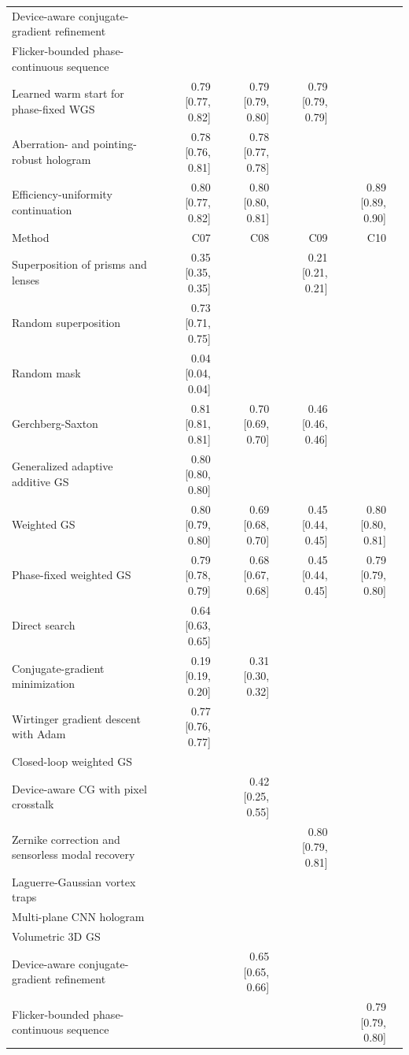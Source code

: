 \begin{longtable}{@{}>{\raggedright\arraybackslash}p{} rrrrr@{}}
Device-aware conjugate-gradient refinement &  &  &  &  & \\
Flicker-bounded phase-continuous sequence &  &  &  &  & \\
Learned warm start for phase-fixed WGS & 0.79 [0.77, 0.82] & 0.79 [0.79, 0.80] & 0.79 [0.79, 0.79] &  & \\
Aberration- and pointing-robust hologram & 0.78 [0.76, 0.81] & 0.78 [0.77, 0.78] &  &  & \\
Efficiency-uniformity continuation & 0.80 [0.77, 0.82] & 0.80 [0.80, 0.81] &  & 0.89 [0.89, 0.90] & \\
\midrule
Method & C07 & C08 & C09 & C10 &\\
\midrule
Superposition of prisms and lenses & 0.35 [0.35, 0.35] &  & 0.21 [0.21, 0.21] &  &\\
Random superposition & 0.73 [0.71, 0.75] &  &  &  &\\
Random mask & 0.04 [0.04, 0.04] &  &  &  &\\
Gerchberg-Saxton & 0.81 [0.81, 0.81] & 0.70 [0.69, 0.70] & 0.46 [0.46, 0.46] &  &\\
Generalized adaptive additive GS & 0.80 [0.80, 0.80] &  &  &  &\\
Weighted GS & 0.80 [0.79, 0.80] & 0.69 [0.68, 0.70] & 0.45 [0.44, 0.45] & 0.80 [0.80, 0.81] &\\
Phase-fixed weighted GS & 0.79 [0.78, 0.79] & 0.68 [0.67, 0.68] & 0.45 [0.44, 0.45] & 0.79 [0.79, 0.80] &\\
Direct search & 0.64 [0.63, 0.65] &  &  &  &\\
Conjugate-gradient minimization & 0.19 [0.19, 0.20] & 0.31 [0.30, 0.32] &  &  &\\
Wirtinger gradient descent with Adam & 0.77 [0.76, 0.77] &  &  &  &\\
Closed-loop weighted GS &  &  &  &  &\\
Device-aware CG with pixel crosstalk &  & 0.42 [0.25, 0.55] &  &  &\\
Zernike correction and sensorless modal recovery &  &  & 0.80 [0.79, 0.81] &  &\\
Laguerre-Gaussian vortex traps &  &  &  &  &\\
Multi-plane CNN hologram &  &  &  &  &\\
Volumetric 3D GS &  &  &  &  &\\
Device-aware conjugate-gradient refinement &  & 0.65 [0.65, 0.66] &  &  &\\
Flicker-bounded phase-continuous sequence &  &  &  & 0.79 [0.79, 0.80] &\\

\end{longtable}

